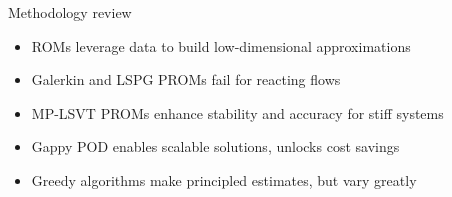 \documentclass[]{beamer}
\begin{document}
\begin{frame}{Methodology review}
	\begin{itemize}
		\item ROMs leverage data to build low-dimensional approximations
		\item Galerkin and LSPG PROMs fail for reacting flows
		\item MP-LSVT PROMs enhance stability and accuracy for stiff systems
		\item Gappy POD enables scalable solutions, unlocks cost savings
		\item Greedy algorithms make principled estimates, but vary greatly
	\end{itemize}
\end{frame}

\section*{}
\end{document}
